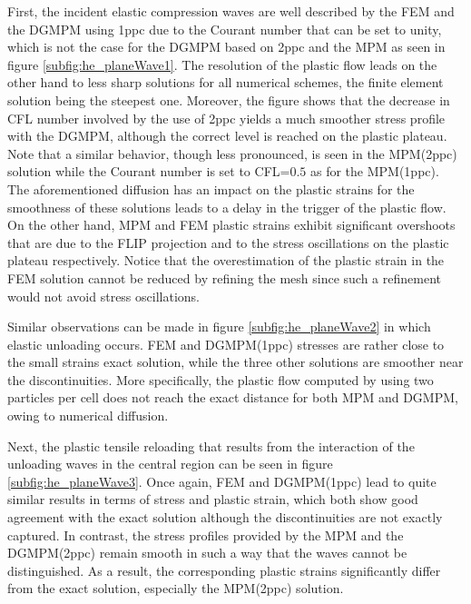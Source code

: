 First, the incident elastic compression waves are well described by the FEM and the DGMPM using 1ppc due to the Courant number that can be set to unity, which is not the case for the DGMPM based on 2ppc and the MPM as seen in figure \ref{subfig:he_planeWave1}. 
The resolution of the plastic flow leads on the other hand to less sharp solutions for all numerical schemes, the finite element solution being the steepest one.
Moreover, the figure shows that the decrease in CFL number involved by the use of 2ppc yields a much smoother stress profile with the DGMPM, although the correct level is reached on the plastic plateau.
Note that a similar behavior, though less pronounced, is seen in the MPM(2ppc) solution while the Courant number is set to CFL=$0.5$ as for the MPM(1ppc).
The aforementioned diffusion has an impact on the plastic strains for the smoothness of these solutions leads to a delay in the trigger of the plastic flow.
On the other hand, MPM and FEM plastic strains exhibit significant overshoots that are due to the FLIP projection \cite{Thesis} and to the stress oscillations on the plastic plateau respectively.
Notice that the overestimation of the plastic strain in the FEM solution cannot be reduced by refining the mesh since such a refinement would not avoid stress oscillations.

Similar observations can be made in figure \ref{subfig:he_planeWave2} in which elastic unloading occurs.
FEM and DGMPM(1ppc) stresses are rather close to the small strains exact solution, while the three other solutions are smoother near the discontinuities.
More specifically, the plastic flow computed by using two particles per cell does not reach the exact distance for both MPM and DGMPM, owing to numerical diffusion.

Next, the plastic tensile reloading that results from the interaction of the unloading waves in the central region can be seen in figure \ref{subfig:he_planeWave3}.
Once again, FEM and DGMPM(1ppc) lead to quite similar results in terms of stress and plastic strain, which both show good agreement with the exact solution although the discontinuities are not exactly captured.
In contrast, the stress profiles provided by the MPM and the DGMPM(2ppc) remain smooth in such a way that the waves cannot be distinguished.
As a result, the corresponding plastic strains significantly differ from the exact solution, especially the MPM(2ppc) solution.

